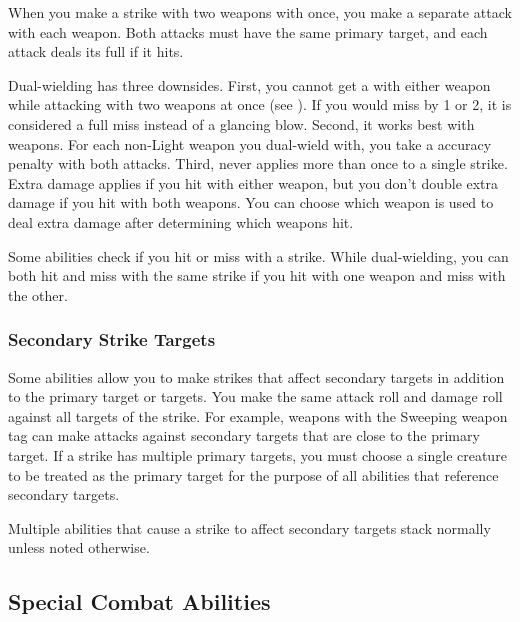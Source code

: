            When you make a strike with two weapons with once, you make a separate attack with each weapon.
            Both attacks must have the same primary target, and each attack deals its full  if it hits.

            Dual-wielding has three downsides.
            First, you cannot get a  with either weapon while attacking with two weapons at once (see ).
            If you would miss by 1 or 2, it is considered a full miss instead of a glancing blow.
            Second, it works best with  weapons.
            For each non-Light weapon you dual-wield with, you take a  accuracy penalty with both attacks.
            Third,  never applies more than once to a single strike.
            Extra damage applies if you hit with either weapon, but you don't double extra damage if you hit with both weapons.
            You can choose which weapon is used to deal extra damage after determining which weapons hit.

            Some abilities check if you hit or miss with a strike.
            While dual-wielding, you can both hit and miss with the same strike if you hit with one weapon and miss with the other.

        \subsubsection{Secondary Strike Targets}\label{Secondary Strike Targets}
            Some abilities allow you to make strikes that affect secondary targets in addition to the primary target or targets.
            You make the same attack roll and damage roll against all targets of the strike.
            For example, weapons with the Sweeping weapon tag can make attacks against secondary targets that are close to the primary target.
            If a strike has multiple primary targets, you must choose a single creature to be treated as the primary target for the purpose of all abilities that reference secondary targets.

            Multiple abilities that cause a strike to affect secondary targets stack normally unless noted otherwise.

    \subsection{Special Combat Abilities}\label{Special Combat Abilities}

